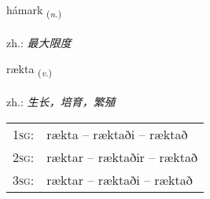 \documentclass[frontgrid, backgrid]{flacards}\usepackage[]{graphicx}\usepackage[]{xcolor}
\begin{document}
\renewcommand{\flhead}{\vskip5pt \fboxsep=0pt {\small\bfseries\footnotesize Nafnorð | 名词}}
\renewcommand{\fcfoot}{\vskip5pt \fboxsep=0pt \hspace{2pt}{\small\bfseries\footnotesize 3K}}

\renewcommand{\blhead}{\vskip5pt {\small\bfseries\footnotesize Nafnorð | 名词 }}
\renewcommand{\bcfoot}{\vskip5pt \hspace{2pt}{\small\bfseries\footnotesize 3K}}


{hámark \small{\textsubscript{(\textit{n.})}} \\[1ex] %
\textphonetic{[hauːmar̥k]} \\
zh.: \emph{最大限度} \\  [2ex]
\renewcommand*{\arraystretch}{0.8}
}

\renewcommand{\flhead}{\vskip5pt \fboxsep=0pt {\small\bfseries\footnotesize Sagnorð | 动词}}
\renewcommand{\fcfoot}{\vskip5pt \fboxsep=0pt \hspace{2pt}{\small\bfseries\footnotesize 3K}}

\renewcommand{\blhead}{\vskip5pt {\small\bfseries\footnotesize Sagnorð | 动词 }}
\renewcommand{\bcfoot}{\vskip5pt \hspace{2pt}{\small\bfseries\footnotesize 3K}}


{rækta \small{\textsubscript{(\textit{v.})}} \\[1ex] %
\textphonetic{[raixta]} \\
zh.: \emph{生长，培育，繁殖} \\  [2ex]
\renewcommand*{\arraystretch}{0.8}
\begin{tabular}{p{1cm}l}
\textsc{1sg}: & rækta -- ræktaði -- ræktað \\ 
\textsc{2sg}: & ræktar -- ræktaðir -- ræktað \\ 
\textsc{3sg}: & ræktar -- ræktaði -- ræktað \\ 
\end{tabular}
}
\end{document}
